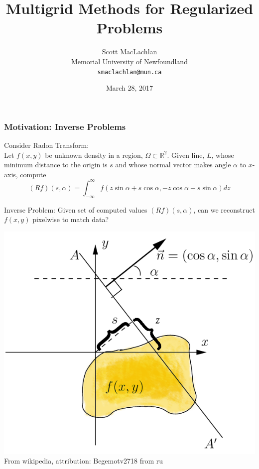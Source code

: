 \documentclass[12pt,t,xcolor=dvipsnames]{beamer}
\title{Multigrid Methods for Regularized Problems}
\author{Scott MacLachlan \\ Memorial University of Newfoundland \\ \texttt{smaclachlan@mun.ca}}
\date{March 28, 2017}
\institute{and \\ Matthias Bolten, Universit\"at Kassel \\ Misha Kilmer, Tufts University}
\begin{document}
\maketitle

\begin{frame}
  \frametitle{Motivation: Inverse Problems}

  Consider Radon Transform:\\ Let $f(x,y)$ be unknown density in a
  region, $\Omega \subset \mathbb{R}^2$.  Given line, $L$, whose
  minimum distance to the origin is $s$ and whose normal vector makes
  angle $\alpha$ to $x$-axis, compute
  \[
(Rf)(s,\alpha) = \int_{-\infty}^{\infty} f(z\sin\alpha+s\cos\alpha,-z\cos\alpha+s\sin\alpha)dz
  \]

  \begin{minipage}{0.48\textwidth}
  \alert{Inverse Problem:} Given set of computed values
  $(Rf)(s,\alpha)$, can we reconstruct $f(x,y)$ pixelwise to match
  data?
  \end{minipage}
  \begin{minipage}{0.48\textwidth}
    \begin{center}
      \includegraphics[width=0.7\linewidth]{Radon_transform} \\
      {\tiny From wikipedia, attribution: Begemotv2718 from ru}
    \end{center}
  \end{minipage}
  

\end{frame}
\end{document}
